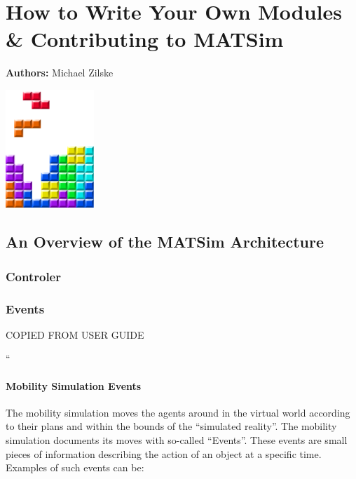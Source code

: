 \chapter{How to Write Your Own Modules \& Contributing to MATSim }
\label{ch:extensionpoints}
\hfill \textbf{Authors:} Michael Zilske

\begin{center} \includegraphics[width=0.25\textwidth, angle=0]{figures/MATSimBook.png} \end{center}

\section{An Overview of the MATSim Architecture}
\subsection{Controler}

\subsection{Events}
\label{sec:events}

COPIED FROM USER GUIDE

``
\subsubsection{Mobility Simulation Events}

The mobility simulation moves the agents around in the virtual world according to their plans and within the bounds of the ``simulated reality''. The mobility simulation documents its moves with so-called ``Events''. These events are small pieces of information describing the action of an object at a specific time. Examples of such events can be:

